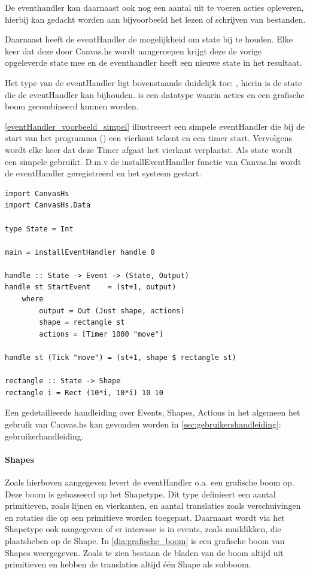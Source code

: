 De eventhandler kan daarnaast ook nog een aantal uit te voeren acties opleveren, hierbij kan gedacht worden aan bijvoorbeeld het lezen of schrijven van bestanden. 

Daarnaast heeft de eventHandler de mogelijkheid om state bij te houden. Elke keer dat deze door Canvas.hs wordt aangeroepen krijgt deze de vorige opgeleverde state mee en de eventhandler heeft een nieuwe state in het resultaat. 

Het type van de eventHandler ligt bovenstaande duidelijk toe: , hierin is  de state die de eventHandler kan bijhouden.  is een datatype waarin acties en een grafische boom gecombineerd kunnen worden.


\autoref{eventHandler_voorbeeld_simpel} illustreeert een simpele eventHandler die bij de start van het programma () een vierkant tekent en een timer start. Vervolgens wordt elke keer dat deze Timer afgaat het vierkant verplaatst. Als state wordt een simpele  gebruikt. D.m.v de installEventHandler functie van Canvas.hs wordt de eventHandler geregistreerd en het systeem gestart.

\begin{lstlisting}[caption=Voorbeeld van een simpele eventHandler, label=eventHandler_voorbeeld_simpel]
import CanvasHs
import CanvasHs.Data

type State = Int

main = installEventHandler handle 0

handle :: State -> Event -> (State, Output)
handle st StartEvent    = (st+1, output)
	where 
		output = Out (Just shape, actions)
		shape = rectangle st
		actions = [Timer 1000 "move"]
		
handle st (Tick "move") = (st+1, shape $ rectangle st)
		
rectangle :: State -> Shape
rectangle i = Rect (10*i, 10*i) 10 10
\end{lstlisting}

Een gedetailleerde handleiding over Events, Shapes, Actions in het algemeen het gebruik van Canvas.hs kan gevonden worden in \autoref{sec:gebruikershandleiding}: gebruikerhandleiding.

\paragraph{Shapes}
\label{par:globaal_shapes}
Zoals hierboven aangegeven levert de eventHandler o.a. een grafische boom op. Deze boom is gebasseerd op het Shapetype. Dit type definieert een aantal primitieven, zoals lijnen en vierkanten, en aantal translaties zoals verschuivingen en rotaties die op een primitieve worden toegepast. Daarnaast wordt via het Shapetype ook aangegeven of er interesse is in events, zoals muiklikken, die plaatsheben op de Shape. In \autoref{dia:grafische_boom} is een grafische boom van Shapes weergegeven. Zoals te zien bestaan de bladen van de boom altijd uit primitieven en hebben de translaties altijd één Shape als subboom.


